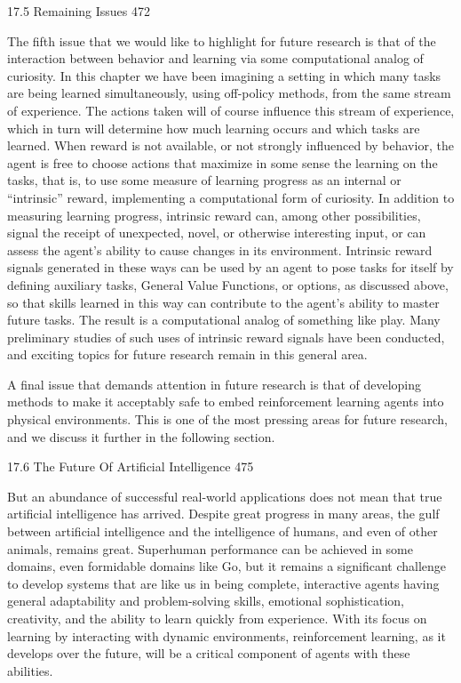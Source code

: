 17.5 Remaining Issues 472

The fifth issue that we would like to highlight for future research is that of the interaction between behavior and learning via some computational analog of curiosity. In this chapter we have been imagining a setting in which many tasks are being learned simultaneously, using off-policy methods, from the same stream of experience. The actions taken will of course influence this stream of experience, which in turn will determine how much learning occurs and which tasks are learned. When reward is not available, or not strongly influenced by behavior, the agent is free to choose actions that maximize in some sense the learning on the tasks, that is, to use some measure of learning progress as an internal or “intrinsic” reward, implementing a computational form of curiosity. In addition to measuring learning progress, intrinsic reward can, among other possibilities, signal the receipt of unexpected, novel, or otherwise interesting input, or can assess the agent's ability to cause changes in its environment. Intrinsic reward signals generated in these ways can be used by an agent to pose tasks for itself by defining auxiliary tasks, General Value Functions, or options, as discussed above, so that skills learned in this way can contribute to the agent's ability to master future tasks. The result is a computational analog of something like play. Many preliminary studies of such uses of intrinsic reward signals have been conducted, and exciting topics for future research remain in this general area.

A final issue that demands attention in future research is that of developing methods to make it acceptably safe to embed reinforcement learning agents into physical environments. This is one of the most pressing areas for future research, and we discuss it further in the following section.

17.6 The Future Of Artificial Intelligence 475

But an abundance of successful real-world applications does not mean that true artificial intelligence has arrived. Despite great progress in many areas, the gulf between artificial intelligence and the intelligence of humans, and even of other animals, remains great. Superhuman performance can be achieved in some domains, even formidable domains like Go, but it remains a significant challenge to develop systems that are like us in being complete, interactive agents having general adaptability and problem-solving skills, emotional sophistication, creativity, and the ability to learn quickly from experience. With its focus on learning by interacting with dynamic environments, reinforcement learning, as it develops over the future, will be a critical component of agents with these abilities.

